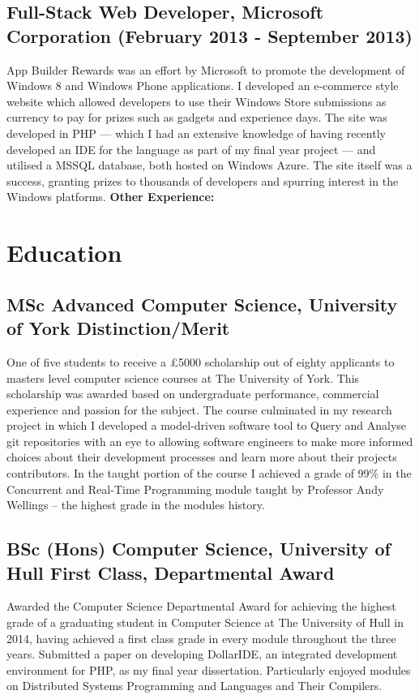 \documentclass[10pt,letterpaper]{article}
\begin{document}
	\subsection*{Full-Stack Web Developer, Microsoft Corporation \small{(February 2013 - September 2013)}}
	App Builder Rewards was an effort by Microsoft to promote the development of Windows 8 and Windows Phone applications. I developed an e-commerce style website which allowed developers to use their Windows Store submissions as currency to pay for prizes such as gadgets and experience days. The site was developed in PHP — which I had an extensive knowledge of having recently developed an IDE for the language as part of my final year project — and utilised a MSSQL database, both hosted on Windows Azure. The site itself was a success, granting prizes to thousands of developers and spurring interest in the Windows platforms.
	\newline \newline
	\bfseries{ Other Experience: } 
	
	\section*{Education}
	\subsection*{MSc Advanced Computer Science, University of York \small{Distinction/Merit}}
	One of five students to receive a \pounds5000 scholarship out of eighty applicants to masters level computer science courses at The University of York. This scholarship was awarded based on undergraduate performance, commercial experience and passion for the subject. The course culminated in my research project in which I developed a model-driven software tool to Query and Analyse git repositories with an eye to allowing software engineers to make more informed choices about their development processes and learn more about their projects contributors. In the taught portion of the course I achieved a grade of 99\% in the Concurrent and Real-Time Programming module taught by Professor Andy Wellings -- the highest grade in the modules history.

	\subsection*{BSc (Hons) Computer Science, University of Hull \small{First Class, Departmental Award}}
	Awarded the Computer Science Departmental Award for achieving the highest grade of a graduating student in Computer Science at The University of Hull in 2014, having achieved a first class grade in every module throughout the three years. Submitted a paper on developing DollarIDE, an integrated development environment for PHP, as my final year dissertation. Particularly enjoyed modules on Distributed Systems Programming and Languages and Their Compilers.
\end{document}
